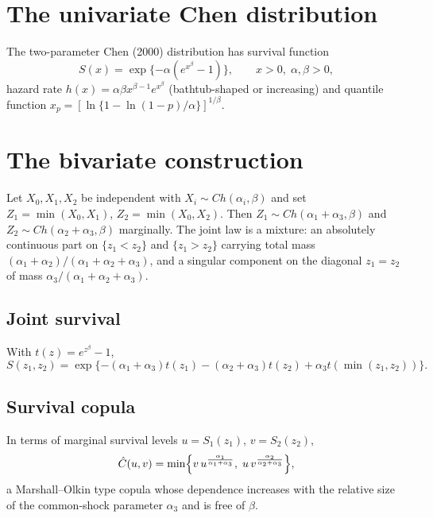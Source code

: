 \documentclass[11pt,a4paper]{article}
\begin{document}
\tableofcontents
\newpage

\section{The univariate Chen distribution}
The two-parameter Chen (2000) distribution has survival function
\begin{equation}
S(x)=\exp\{-\alpha(e^{x^{\beta}}-1)\}, \qquad x>0,
\; \alpha,\beta>0,
\label{eq:chen}
\end{equation}
hazard rate $h(x)=\alpha\beta x^{\beta-1}e^{x^{\beta}}$
(bathtub-shaped or increasing) and quantile function
$x_p=[\ln\{1-\ln(1-p)/\alpha\}]^{1/\beta}$.

\section{The bivariate construction}
Let $X_0,X_1,X_2$ be independent with $X_i \sim Ch(\alpha_i,\beta)$
and set $Z_1=\min(X_0,X_1)$, $Z_2=\min(X_0,X_2)$. Then
$Z_1 \sim Ch(\alpha_1+\alpha_3,\beta)$ and
$Z_2 \sim Ch(\alpha_2+\alpha_3,\beta)$ marginally. The joint law is a
mixture: an absolutely continuous part on $\{z_1<z_2\}$ and
$\{z_1>z_2\}$ carrying total mass
$(\alpha_1+\alpha_2)/(\alpha_1+\alpha_2+\alpha_3)$, and a singular
component on the diagonal $z_1=z_2$ of mass
$\alpha_3/(\alpha_1+\alpha_2+\alpha_3)$.

\subsection{Joint survival}
With $t(z)=e^{z^{\beta}}-1$,
\begin{equation}
S(z_1,z_2)=\exp\{-(\alpha_1+\alpha_3)t(z_1)-(\alpha_2+\alpha_3)t(z_2)
+\alpha_3 t(\min(z_1,z_2))\}.
\label{eq:surv}
\end{equation}

\subsection{Survival copula}
In terms of marginal survival levels $u=S_1(z_1)$, $v=S_2(z_2)$,
\begin{equation}
\hat C(u,v)=\min\Bigl\{v\,u^{\frac{\alpha_1}{\alpha_1+\alpha_3}},\;
u\,v^{\frac{\alpha_2}{\alpha_2+\alpha_3}}\Bigr\},
\label{eq:cop}
\end{equation}
a Marshall--Olkin type copula whose dependence increases with the
relative size of the common-shock parameter $\alpha_3$ and is free
of $\beta$.
\end{document}
